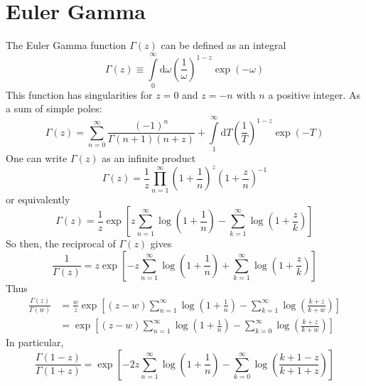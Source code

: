 \section{Euler Gamma}
The Euler Gamma function $\Gamma(z)$ can be defined as an integral
\begin{equation}
	\Gamma(z) \equiv \int\limits_{0}^{\infty} \mathrm{d}\omega \left( \frac{1}{\omega} \right)^{1-z} \exp{(- \omega)}
\end{equation}
This function has singularities for $z = 0$ and $z = -n$ with $n$ a positive integer. As a sum of simple poles:
\begin{equation}
	\Gamma(z) = \sum_{n = 0}^{\infty} \frac{(-1)^{n}}{\Gamma(n + 1)(n + z)} + \int\limits_{1}^{\infty} \mathrm{d}T \left( \frac{1}{T} \right)^{1 - z} \exp{\left( - T \right)}
\end{equation}
One can write $\Gamma(z)$ as an infinite product
\begin{equation}
	\Gamma(z) = \frac{1}{z} \prod_{n = 1}^{\infty}\left( 1 + \frac{1}{n} \right)^{z} \left( 1 + \frac{z}{n} \right)^{-1}
\end{equation}
or equivalently
\begin{equation}
	\Gamma(z) = \frac{1}{z} \exp{\left[ z \sum_{n = 1}^{\infty} \log{\left( 1 + \frac{1}{n} \right)} - \sum_{k = 1}^{\infty} \log{\left( 1 + \frac{z}{k} \right)} \right]}
\end{equation}
So then, the reciprocal of $\Gamma(z)$ gives
\begin{equation}
	\frac{1}{\Gamma(z)} = z \exp{\left[ -z \sum_{n = 1}^{\infty} \log{\left( 1 + \frac{1}{n} \right)} + \sum_{k = 1}^{\infty} \log{\left( 1 + \frac{z}{k} \right)} \right]}
\end{equation}
Thus
\begin{equation}
\begin{split}
	\frac{\Gamma(z)}{\Gamma(w)} &= \frac{w}{z} \exp{\left[ (z - w) \sum_{n = 1}^{\infty} \log{\left( 1 + \frac{1}{n} \right)} - \sum_{k = 1}^{\infty} \log{\left( \frac{k + z}{k + w} \right)} \right]} \\
	&= \exp{\left[ (z - w) \sum_{n = 1}^{\infty} \log{\left( 1 + \frac{1}{n} \right)} - \sum_{k = 0}^{\infty} \log{\left( \frac{k + z}{k + w} \right)} \right]}
\end{split}
\end{equation}
In particular,
\begin{equation}
	\frac{\Gamma(1 - z)}{\Gamma(1 + z)} = \exp{\left[ - 2 z \sum_{n = 1}^{\infty} \log{\left( 1 + \frac{1}{n} \right)} - \sum_{k = 0}^{\infty} \log{\left( \frac{k + 1 - z}{k + 1 + z} \right)} \right]}
\end{equation}


